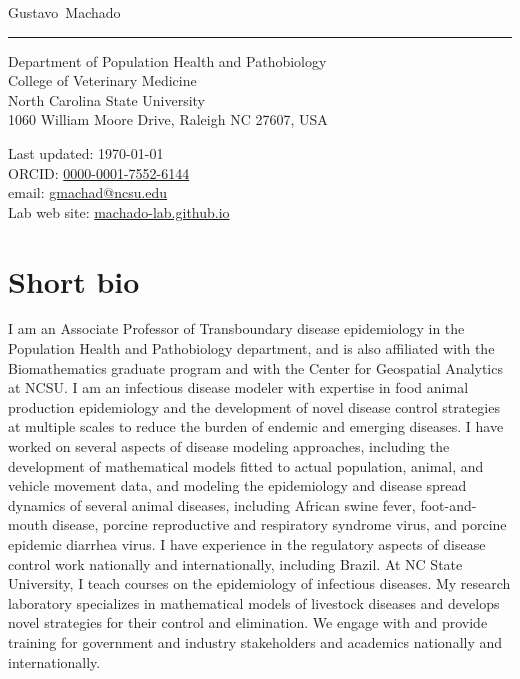 \documentclass[11pt]{article}
\makeatletter
\newcommand{\NCSU}{North Carolina State University}
\newcommand{\vet}{College of Veterinary Medicine}
\newcommand{\CVM}{Department of Population Health and Pathobiology}
\newcommand{\FirstName}{Gustavo}
\newcommand{\LastName}{Machado}
\newcommand{\MyName}{\FirstName\ \LastName}
\newcommand{\Email}{gmachad@ncsu.edu}
\newcommand{\LabWebsite}{machado-lab.github.io}
\newcommand{\ORCID}{0000-0001-7552-6144}
\newcommand{\Affiliation}{\CVM \\ \vet \\ \NCSU}
\newcommand{\Address}{
  1060 William Moore Drive, Raleigh NC 27607, USA
}
\makeatother
\begin{document}
\thispagestyle{empty}

{\fontsize{22pt}{0}\selectfont\MyName}\\[-0.1cm]
\rule{\textwidth}{0.2pt}
\begin{minipage}[t]{0.595\textwidth}
  \Affiliation
  \\
  \Address
\end{minipage}
\begin{minipage}[t]{0.405\textwidth}
  \begin{flushright}
  Last updated: \monthyear\today
  \\
    ORCID: \href{https://orcid.org/\ORCID}{\ORCID}
    \\
    email: \href{mailto:\Email}{\Email}
    \\
    Lab web site: \href{https://\LabWebsite}{\LabWebsite}
  \end{flushright}
\end{minipage}

\section{Short bio}

I am an Associate Professor of Transboundary disease epidemiology in the Population Health and Pathobiology department, and is also affiliated with the
Biomathematics graduate program and with the Center for Geospatial Analytics at NCSU.
I am an infectious disease modeler with expertise in food animal production epidemiology and the development of novel disease control strategies at multiple scales to reduce the burden of endemic and emerging diseases. I have worked on several aspects of disease modeling approaches, including the development of mathematical models fitted to actual population, animal, and vehicle movement data, and modeling the epidemiology and disease spread dynamics of several animal diseases, including African swine fever, foot-and-mouth disease, porcine reproductive and respiratory syndrome virus, and porcine epidemic diarrhea virus. I have experience in the regulatory aspects of disease control work nationally and internationally, including Brazil. At NC State University, I teach courses on the epidemiology of infectious diseases. My research laboratory specializes in mathematical models of livestock diseases and develops novel strategies for their control and elimination. We engage with and provide training for government and industry stakeholders and academics nationally and internationally.
\end{document}
